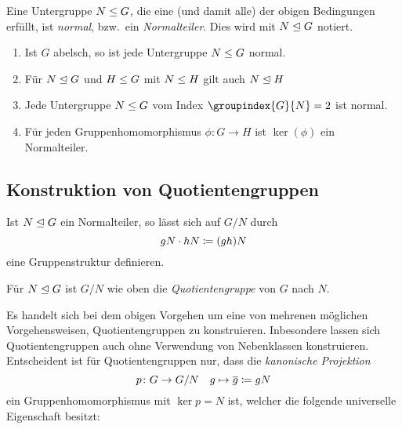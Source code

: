 \begin{definition}
  Eine Untergruppe $N \mathrel{\leq} G$, die eine \textup(und damit alle\textup) der obigen Bedingungen erfüllt, ist \emph{normal}, bzw.\ ein \emph{Normalteiler}.
  Dies wird mit $N \mathrel{\trianglelefteq} G$ notiert.
\end{definition}

\begin{example}
  \begin{enumerate}
    \item
      Ist $G$ abelsch, so ist jede Untergruppe $N \mathrel{\leq} G$ normal.
    \item
      Für $N \mathrel{\trianglelefteq} G$ und $H \mathrel{\leq} G$ mit $N \mathrel{\leq} H$ gilt auch $N \mathrel{\trianglelefteq} H$
    \item
      Jede Untergruppe $N \mathrel{\leq} G$ vom Index $\groupindex{G}{N} = 2$ ist normal.
    \item
      Für jeden Gruppenhomomorphismus $\phi \colon G \to H$ ist $\ker(\phi)$ ein Normalteiler.
  \end{enumerate}
\end{example}



\subsection{Konstruktion von Quotientengruppen}

Ist $N \mathrel{\trianglelefteq} G$ ein Normalteiler, so lässt sich auf $G/N$ durch
\[
            gN
  \cdot     hN
  \coloneqq  (gh)N
\]
eine Gruppenstruktur definieren.

\begin{definition}
  Für $N \mathrel{\trianglelefteq} G$ ist $G/N$ wie oben die \emph{Quotientengruppe} von $G$ nach $N$.
\end{definition}

\begin{remark}
  Es handelt sich bei dem obigen Vorgehen um eine von mehrenen möglichen Vorgehensweisen, Quotientengruppen zu konstruieren.
  Inbesondere lassen sich Quotientengruppen auch ohne Verwendung von Nebenklassen konstruieren.
  Entscheident ist für Quotientengruppen nur, dass die \emph{kanonische Projektion}
  \[
              p
    \colon    G
    \to       G/N
    \quad     g
    \mapsto   \overline{g}
    \coloneqq  gN
  \]
  ein Gruppenhomomorphismus mit $\ker p = N$ ist, welcher die folgende universelle Eigenschaft besitzt:
\end{remark}



